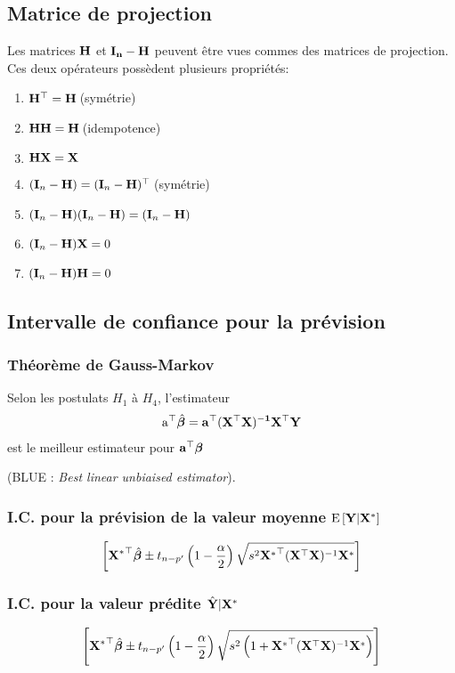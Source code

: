 \documentclass[10pt, french]{article}
\begin{document}
\begin{multicols*}{3}
\subsection*{Matrice de projection}
Les matrices $\mathbf{H}$ et $\mathbf{I_n - H}$ peuvent être vues commes des matrices de projection. Ces deux opérateurs possèdent plusieurs propriétés:
\begin{enumerate}
	\item $\mathbf{H}^\top = \mathbf{H}\:$(symétrie)
	\item $\mathbf{H}\mathbf{H} = \mathbf{H}\:$(idempotence)
	\item $\mathbf{HX} = \mathbf{X}$
	\item $(\mathbf{I}_n - \mathbf{H}) = (\mathbf{I}_n - \mathbf{H})^\top \:$(symétrie)
	\item $(\mathbf{I}_n - \mathbf{H})(\mathbf{I}_n - \mathbf{H}) = (\mathbf{I}_n - \mathbf{H})$
	\item $(\mathbf{I}_n - \mathbf{H})\mathbf{X} = 0 $
	\item $(\mathbf{I}_n - \mathbf{H})\mathbf{H} = 0 $
\end{enumerate}

\subsection*{Intervalle de confiance pour la prévision}
\subsubsection*{Théorème de Gauss-Markov}
Selon les postulats $H_1$ à $H_4$, l'estimateur
\begin{align*}
\mathrm{a^\top} \hat{\bm{\beta}} = \mathbf{a^\top (X^\top X)^{-1} X^\top Y}
\end{align*}
est le meilleur estimateur pour $\mathbf{a^\top} \bm{\beta}$

(BLUE : \textit{Best linear unbiaised estimator}).

\subsubsection*{I.C. pour la prévision de la valeur moyenne $\mathrm{E} \left[ \mathbf{Y} | \mathbf{X^*} \right]$}
\begin{align*}
\left[ \mathbf{{X^*}^\top} \hat{\bm{\beta}} \pm t_{n-p'}\left(1 - \frac{\alpha}{2} \right) \sqrt{s^2 \mathbf{{X^*}^\top} (\mathbf{X}^\top \mathbf{X})^{-1}\mathbf{X^*}} \right]
\end{align*}

\subsubsection*{I.C. pour la valeur prédite $\hat{\mathbf{Y}}|\mathbf{X^*}$}
\begin{align*}
\left[ \mathbf{{X^*}^\top} \hat{\bm{\beta}} \pm t_{n-p'}\left(1 - \frac{\alpha}{2} \right) \sqrt{s^2\left( 1 +  \mathbf{{X^*}^\top} (\mathbf{X}^\top \mathbf{X})^{-1}\mathbf{X^*}\right)} \right]
\end{align*}



\end{multicols*}
\end{document}
